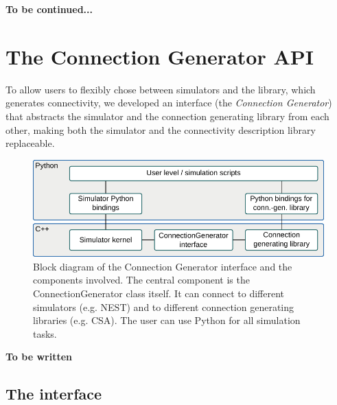 \documentclass{frontiersSCNS} %
\newcommand{\tbw}[1]{{\bf\parindent0pt\color{red}#1}}
\begin{document}
\tbw{To be continued...}


\section{The Connection Generator API}

To allow users to flexibly chose between simulators and the library,
which generates connectivity, we developed an interface (the
\emph{Connection Generator}) that abstracts the simulator and the
connection generating library from each other, making both the
simulator and the connectivity description library replaceable.

\begin{figure}[ht]
\centering
\includegraphics[scale=.8]{figures/block_diagram_conngen.pdf}
\caption{Block diagram of the Connection Generator interface and the
  components involved. The central component is the
  ConnectionGenerator class itself. It can connect to different simulators
  (e.g. NEST) and to different connection generating libraries
  (e.g. CSA). The user can use Python for all simulation
  tasks.}\label{fig:block_diagram_conngen}
\end{figure}

\tbw{To be written}

\subsection{The interface}
\end{document}
